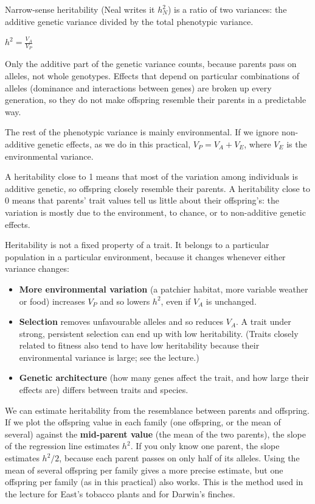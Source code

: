\documentclass[
  a4paper]{book}
\providecommand{\tightlist}{%
  \setlength{\itemsep}{0pt}\setlength{\parskip}{0pt}}
\begin{document}
Narrow-sense heritability (Neal writes it \(h^2_N\)) is a ratio of two variances: the additive genetic variance divided by the total phenotypic variance.

\(h^2 = \frac{V_A}{V_P}\)

Only the additive part of the genetic variance counts, because parents pass on alleles, not whole genotypes. Effects that depend on particular combinations of alleles (dominance and interactions between genes) are broken up every generation, so they do not make offspring resemble their parents in a predictable way.

The rest of the phenotypic variance is mainly environmental. If we ignore non-additive genetic effects, as we do in this practical, \(V_P = V_A + V_E\), where \(V_E\) is the environmental variance.

A heritability close to 1 means that most of the variation among individuals is additive genetic, so offspring closely resemble their parents. A heritability close to 0 means that parents' trait values tell us little about their offspring's: the variation is mostly due to the environment, to chance, or to non-additive genetic effects.

Heritability is not a fixed property of a trait. It belongs to a particular population in a particular environment, because it changes whenever either variance changes:

\begin{itemize}
\tightlist
\item
  \textbf{More environmental variation} (a patchier habitat, more variable weather or food) increases \(V_P\) and so lowers \(h^2\), even if \(V_A\) is unchanged.
\item
  \textbf{Selection} removes unfavourable alleles and so reduces \(V_A\). A trait under strong, persistent selection can end up with low heritability. (Traits closely related to fitness also tend to have low heritability because their environmental variance is large; see the lecture.)
\item
  \textbf{Genetic architecture} (how many genes affect the trait, and how large their effects are) differs between traits and species.
\end{itemize}

We can estimate heritability from the resemblance between parents and offspring. If we plot the offspring value in each family (one offspring, or the mean of several) against the \textbf{mid-parent value} (the mean of the two parents), the slope of the regression line estimates \(h^2\). If you only know one parent, the slope estimates \(h^2/2\), because each parent passes on only half of its alleles. Using the mean of several offspring per family gives a more precise estimate, but one offspring per family (as in this practical) also works. This is the method used in the lecture for East's tobacco plants and for Darwin's finches.
\end{document}
